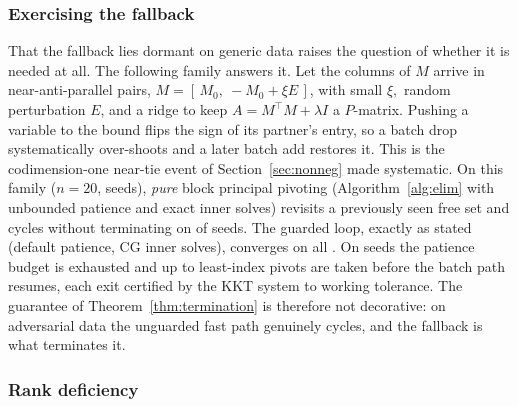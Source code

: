 \subsubsection{Exercising the fallback}\label{sssec:fallback}

That the fallback lies dormant on generic data raises the
question of whether it is needed at all. The following family answers it. Let the columns of
$M$ arrive in near-anti-parallel pairs, $M = [\,M_0,\ -M_0 + \xi E\,]$, with small $\xi,$ random perturbation $E$, and a
ridge to keep $A = M^\top M + \lambda I$ a $P$-matrix. Pushing a variable to the bound flips
the sign of its partner's entry, so a batch drop systematically over-shoots and a later batch
add restores it. This is the codimension-one near-tie event of Section~\ref{sec:nonneg} made
systematic. On this family ($n = 20$, \nncgFbSeeds{} seeds), \emph{pure} block principal
pivoting (Algorithm~\ref{alg:elim} with unbounded patience and exact inner solves)
revisits a previously seen free set and cycles without terminating on \nncgFbCycles{} of
\nncgFbSeeds{} seeds. The guarded loop, exactly as stated (default patience, CG inner
solves), converges on all \nncgFbSeeds{}. On \nncgFbFired{} seeds the patience budget is
exhausted and up to \nncgFbMax{} least-index pivots are taken before the batch path resumes,
each exit certified by the KKT system to working tolerance. The guarantee of
Theorem~\ref{thm:termination} is therefore not decorative: on adversarial data the unguarded
fast path genuinely cycles, and the fallback is what terminates it.

\subsubsection{Rank deficiency}

